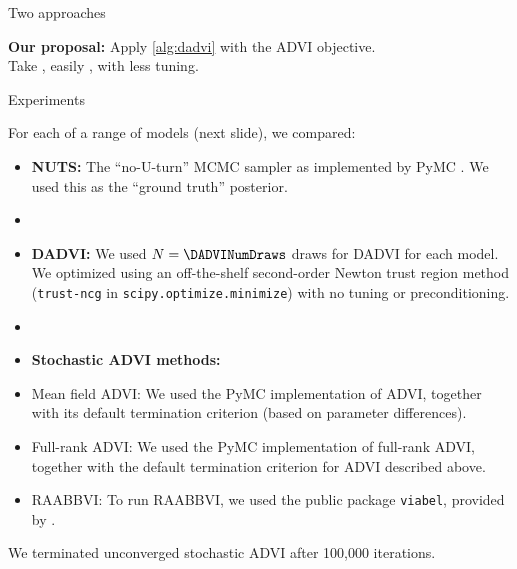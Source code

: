 \documentclass[8pt]{beamer}\usepackage[]{graphicx}\usepackage[]{color}
\begin{document}
\begin{frame}{Two approaches}

\textbf{Our proposal: } Apply \cref{alg:dadvi} with the ADVI objective.  \\
Take , easily , with less tuning.
    
\end{frame}





\begin{frame}{Experiments}

For each of a range of models (next slide), we compared:

\begin{itemize}
    \item \textbf{NUTS:} The ``no-U-turn'' MCMC sampler as implemented by PyMC
    \citep{salvatier:2016:pymc3}.  We used this as the ``ground truth''
    posterior.
    \item[]
    \item \textbf{DADVI:}  We used $\znum=\DADVINumDraws$ draws for DADVI for
    each model. We optimized using an off-the-shelf second-order Newton trust region
    method (\texttt{trust-ncg} in \texttt{scipy.optimize.minimize}) with no
    tuning or preconditioning.
    \item[]
    \item[]\textbf{Stochastic ADVI methods:}
    \item Mean field ADVI: We used the PyMC implementation of
    ADVI, together with its default termination criterion (based on parameter
    differences). 
    \item Full-rank ADVI: We used the PyMC implementation of
    full-rank ADVI, together with the default termination criterion for ADVI
    described above.
    \item RAABBVI: To run RAABBVI, we used the public package
    \texttt{viabel}, provided
    by \citet{welandawe:2022:robustbbvi}.
    \end{itemize}

We terminated unconverged stochastic ADVI after 100,000 iterations.
    

\end{frame}
\end{document}
